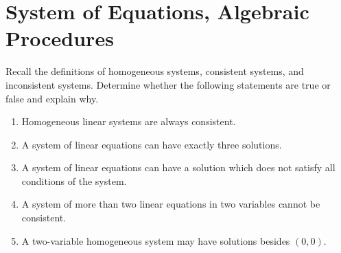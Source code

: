 \documentclass[11pt]{exam}
\begin{document}
\pagebreak
\section{System of Equations, Algebraic Procedures}
    \begin{questions}
        \item Recall the definitions of homogeneous systems, consistent systems, and inconsistent systems. Determine whether the following statements
        are true or false and explain why.
        \begin{enumerate}
            \item Homogeneous linear systems are always consistent.
            \item A system of linear equations can have exactly three solutions.
            \item A system of linear equations can have a solution which does not satisfy all conditions of the system.
            \item A system of more than two linear equations in two variables cannot be consistent.
            \item A two-variable homogeneous system may have solutions besides $(0,0)$.
        \end{enumerate}


\end{questions}
\end{document}
